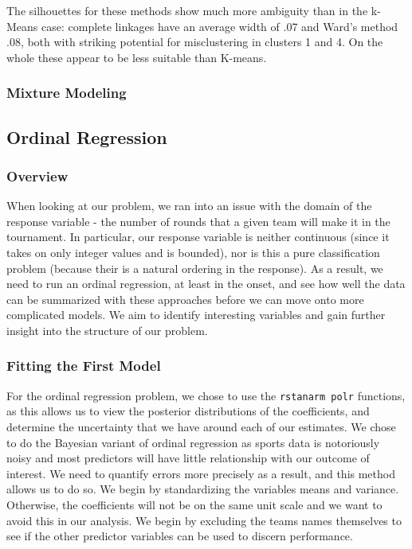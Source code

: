 \documentclass[10pt,a4paper, hidelinks]{article} %
\begin{document}
The silhouettes for these methods show much more ambiguity than in the k-Means case: complete linkages have an average width of .07 and Ward's method .08, both with striking potential for misclustering in clusters 1 and 4.  On the whole these appear to be less suitable than K-means.

\subsubsection{Mixture Modeling}


\subsection{Ordinal Regression}
\subsubsection{Overview}
When looking at our problem, we ran into an issue with the domain of the response variable - the number of rounds that a given team will make it in the tournament. In particular, our response variable is neither continuous (since it takes on only integer values and is bounded), nor is this a pure classification problem (because their is a natural ordering in the response). As a result, we need to run an ordinal regression, at least in the onset, and see how well the data can be summarized with these approaches before we can move onto more complicated models. We aim to identify interesting variables and gain further insight into the structure of our problem.  

\subsubsection{Fitting the First Model}
For the ordinal regression problem, we chose to use the \texttt{rstanarm polr} functions, as this allows us to view the posterior distributions of the coefficients, and determine the uncertainty that we have around each of our estimates. We chose to do the Bayesian variant of ordinal regression as sports data is notoriously noisy and most predictors will have little relationship with our outcome of interest. We need to quantify errors more precisely as a result, and this method allows us to do so. We begin by standardizing the variables means and variance. Otherwise, the coefficients will not be on the same unit scale and we want to avoid this in our analysis. We begin by excluding the teams names themselves to see if the other predictor variables can be used to discern performance. 
\end{document}
